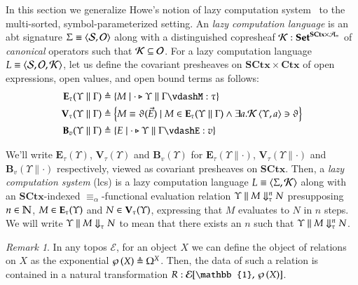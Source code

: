 \documentclass[11pt]{article}
\theoremstyle{definition}
\theoremstyle{remark}
\newtheorem{remark}[thm]{Remark}
\numberwithin{equation}{section}
\def\IModeColorName{MidnightBlue}
\def\OModeColorName{Maroon}
\def\IModeColorName{Black}
\def\OModeColorName{Black}
\newcommand\IMode[1]{{\color{\IModeColorName}{#1}}}
\newcommand\OMode[1]{{\color{\OModeColorName}{#1}}}
\newcommand\MkSet[1]{\left\{#1\right\}}
\newcommand\Member[2]{\IMode{#1}\in\IMode{#2}}
\newcommand\Of[2]{\IMode{#1}: \IMode{#2}}
\newcommand\Match[2]{\IMode{#1}\equiv\OMode{#2}}
\newcommand\Sorts{\mathcal{S}}
\newcommand\Arities{\mathcal{A}}
\newcommand\Operators{\mathcal{O}}
\newcommand\CanOperators{\mathcal{K}}
\newcommand\Discrete[1]{#1_{\equiv}}
\newcommand\Sets{\mathbf{Set}}
\newcommand\SCtx{\mathbf{SCtx}}
\newcommand\Ctx{\mathbf{Ctx}}
\newcommand\Pair[2]{\left\langle#1, #2 \right\rangle}
\newcommand\Tuple[1]{\left\langle#1 \right\rangle}
\newcommand\IsAbtUnmoded[5]{
  #1\triangleright%
  #2\parallel%
  #3\vdash%
  #4:\OMode{#5}%
}
\newcommand\App[2]{#1(#2)}
\newcommand\Hom[3]{#1\!\left[#2,\,#3\right]}
\newcommand\IsSubsetEq[2]{\IMode{#1}\subseteq\IMode{#2}}
\newcommand\Define[2]{\IMode{#1}\triangleq\OMode{#2}}
\newcommand\ADefine[2]{\IMode{#1}&\triangleq\OMode{#2}}
\newcommand\Pow[1]{\wp\left(#1\right)}
\newcommand\EvalN[5]{\IMode{#1}\parallel\IMode{#4}\Downarrow^{\OMode{#3}}_{\IMode{#2}}\OMode{#5}}
\newcommand\Eval[4]{\EvalN{#1}{#2}{}{#3}{#4}}
\newcommand\Exprs{\mathbf{E}}
\newcommand\Values{\mathbf{V}}
\newcommand\BTms{\mathbf{B}}
\newcommand\Naturals{\mathbb{N}}
\begin{document}
In this section we generalize Howe's notion of lazy computation
system~\cite{howe:1989} to the multi-sorted, symbol-parameterized setting. An
\emph{lazy computation language} is an abt signature
$\Match{\Sigma}{\Pair{\Sorts}{\Operators}}$ along with a distinguished
copresheaf $\Of{\CanOperators}{\Sets^{\SCtx\times\Discrete{\Arities}}}$ of
\emph{canonical} operators such that $\IsSubsetEq{\CanOperators}{\Operators}$.
For a lazy computation language
$\Match{L}{\Tuple{\Sorts,\Operators,\CanOperators}}$, let us define the
covariant presheaves on $\SCtx\times\Ctx$ of open expressions, open values, and open bound terms
as follows:
\begin{align*}
  \ADefine{\Exprs_\tau(\Upsilon\parallel\Gamma)}{
    \MkSet{M \mid \IsAbtUnmoded{\cdot}{\Upsilon}{\Gamma}{M}{\tau}}
  }\\
  \ADefine{\Values_\tau(\Upsilon\parallel\Gamma)}{
    \MkSet{
      M\equiv\App{\vartheta}{\vec{E}}
      \mid M\in\Exprs_\tau(\Upsilon\parallel\Gamma)\land \exists a. \CanOperators\Pair{\Upsilon}{a}\ni\vartheta
    }
  }\\
  \ADefine{
    \BTms_{v}(\Upsilon\parallel\Gamma)
  }{
    \MkSet{E \mid \IsAbtUnmoded{\cdot}{\Upsilon}{\Gamma}{E}{v}}
  }
\end{align*}

We'll write $\Exprs_\tau(\Upsilon)$, $\Values_\tau(\Upsilon)$ and
$\BTms_v(\Upsilon)$ for $\Exprs_\tau(\Upsilon\parallel\cdot)$,
$\Values_\tau(\Upsilon\parallel\cdot)$ and $\BTms_v(\Upsilon\parallel\cdot)$
respectively, viewed as covariant presheaves on $\SCtx$. Then, a \emph{lazy
computation system} (lcs) is a lazy computation language
$\Match{L}{\Pair{\Sigma}{\CanOperators}}$ along with an $\SCtx$-indexed
$\equiv_\alpha$-functional evaluation relation
$\EvalN{\Upsilon}{\tau}{n}{M}{N}$ presupposing $\Member{n}{\Naturals}$,
$\Member{M}{\Exprs_\tau(\Upsilon)}$ and $\Member{N}{\Values_\tau(\Upsilon)}$,
expressing that $M$ evaluates to $N$ in $n$ steps.  We will write
$\Eval{\Upsilon}{\tau}{M}{N}$ to mean that there exists an $n$ such that
$\EvalN{\Upsilon}{\tau}{n}{M}{N}$.

\begin{remark}
  In any topos $\mathcal{E}$, for an object $X$ we can define the object of
  relations on $X$ as the exponential $\Define{\Pow{X}}{\Omega^X}$. Then, the
  data of such a relation is contained in a natural transformation
  $\Of{R}{\Hom{\mathcal{E}}{\mathbb{1}}{\Pow{X}}}$.
\end{remark}

\newcommand\SBinRel[4]{\IMode{#2}\parallel\IMode{#3}\mathrel{#1}\IMode{#4}}
\end{document}
